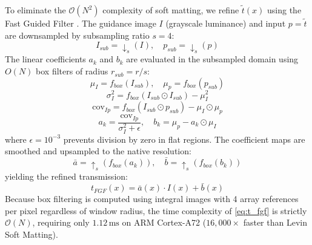 \documentclass[conference]{IEEEtran}
\begin{document}
To eliminate the $\mathcal{O}(N^2)$ complexity of soft matting, we refine $\tilde{t}(x)$ using the Fast Guided Filter \cite{he2015fastguided}. The guidance image $I$ (grayscale luminance) and input $p = \tilde{t}$ are downsampled by subsampling ratio $s = 4$:
\begin{equation}
I_{sub} = \downarrow_s(I), \quad p_{sub} = \downarrow_s(p)
\end{equation}
The linear coefficients $a_k$ and $b_k$ are evaluated in the subsampled domain using $O(N)$ box filters of radius $r_{sub} = r / s$:
\begin{equation}
\mu_{I} = f_{box}(I_{sub}), \quad \mu_{p} = f_{box}(p_{sub})
\end{equation}
\begin{equation}
\sigma_{I}^2 = f_{box}(I_{sub} \odot I_{sub}) - \mu_{I}^2
\end{equation}
\begin{equation}
\text{cov}_{Ip} = f_{box}(I_{sub} \odot p_{sub}) - \mu_{I} \odot \mu_{p}
\end{equation}
\begin{equation}
a_k = \frac{\text{cov}_{Ip}}{\sigma_{I}^2 + \epsilon}, \quad b_k = \mu_{p} - a_k \odot \mu_{I}
\end{equation}
where $\epsilon = 10^{-3}$ prevents division by zero in flat regions. The coefficient maps are smoothed and upsampled to the native resolution:
\begin{equation}
\bar{a} = \uparrow_s(f_{box}(a_k)), \quad \bar{b} = \uparrow_s(f_{box}(b_k))
\end{equation}
yielding the refined transmission:
\begin{equation}
t_{FGF}(x) = \bar{a}(x) \cdot I(x) + \bar{b}(x)
\label{eq:t_fgf}
\end{equation}
Because box filtering is computed using integral images with 4 array references per pixel regardless of window radius, the time complexity of \eqref{eq:t_fgf} is strictly $\mathcal{O}(N)$, requiring only $1.12\,\text{ms}$ on ARM Cortex-A72 ($16,000\times$ faster than Levin Soft Matting).
\end{document}
